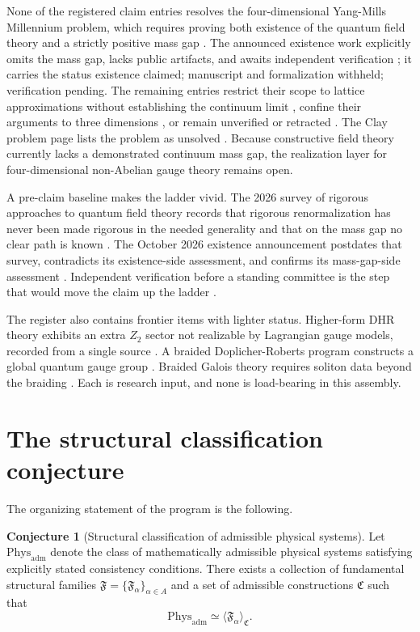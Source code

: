 \documentclass[11pt,letterpaper]{article}
\theoremstyle{definition}
\newtheorem{conjecture}[theorem]{Conjecture}
\begin{document}
None of the registered claim entries resolves the four-dimensional Yang-Mills Millennium problem, which requires proving both existence of the quantum field theory and a strictly positive mass gap \cite{corpus-23}. The announced existence work explicitly omits the mass gap, lacks public artifacts, and awaits independent verification \cite{corpus-24,corpus-25,corpus-26}; it carries the status existence claimed; manuscript and formalization withheld; verification pending. The remaining entries restrict their scope to lattice approximations without establishing the continuum limit \cite{corpus-30,corpus-31,corpus-32}, confine their arguments to three dimensions \cite{corpus-33}, or remain unverified or retracted \cite{corpus-28,corpus-29}. The Clay problem page lists the problem as unsolved \cite{corpus-23}. Because constructive field theory currently lacks a demonstrated continuum mass gap, the realization layer for four-dimensional non-Abelian gauge theory remains open.

A pre-claim baseline makes the ladder vivid. The 2026 survey of rigorous approaches to quantum field theory records that rigorous renormalization has never been made rigorous in the needed generality and that on the mass gap no clear path is known \cite{corpus-27}. The October 2026 existence announcement postdates that survey, contradicts its existence-side assessment, and confirms its mass-gap-side assessment \cite{corpus-24}. Independent verification before a standing committee is the step that would move the claim up the ladder \cite{corpus-25}.

The register also contains frontier items with lighter status. Higher-form DHR theory exhibits an extra $Z_2$ sector not realizable by Lagrangian gauge models, recorded from a single source \cite{corpus-20}. A braided Doplicher-Roberts program constructs a global quantum gauge group \cite{corpus-22}. Braided Galois theory requires soliton data beyond the braiding \cite{corpus-21}. Each is research input, and none is load-bearing in this assembly.

\section{The structural classification conjecture}
\label{sec:conjecture}

The organizing statement of the program is the following.

\begin{conjecture}[Structural classification of admissible physical systems]
\label{conj:structural}
Let $\mathrm{Phys}_{\mathrm{adm}}$ denote the class of mathematically admissible physical systems satisfying explicitly stated consistency conditions. There exists a collection of fundamental structural families $\mathfrak{F} = \{\mathfrak{F}_\alpha\}_{\alpha \in A}$ and a set of admissible constructions $\mathfrak{C}$ such that
\[
  \mathrm{Phys}_{\mathrm{adm}} \simeq \langle \mathfrak{F}_\alpha \rangle_{\mathfrak{C}}.
\]
\end{conjecture}
\end{document}
